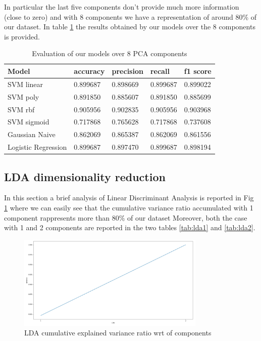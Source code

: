\documentclass[a4paper,12pt]{article}
\begin{document}
\noindent In particular the last five components don't provide much more information (close to zero) and with 8 components we have a representation of around 80\% of our dataset. In table \ref{tab:pca} the results obtained by our models over the 8 components is provided.

\begin{table}[H]
  \begin{tabular}{ |p{6cm}||p{2cm}|p{2cm}|p{2cm}|p{2cm}| }
    \hline
    Model& accuracy & precision  &  recall & f1 score \\
    \hline
SVM linear&           0.899687&   0.898669&  0.899687&  0.899022\\
SVM poly   &          0.891850&   0.885607&  0.891850&  0.885699\\
SVM rbf     &         0.905956&   0.902835&  0.905956&  0.903968\\
SVM sigmoid  &        0.717868&   0.765628&  0.717868&  0.737608\\
Gaussian Naive  &        0.862069&   0.865387&  0.862069&  0.861556\\
Logistic Regression&  0.899687&   0.897470&  0.899687&  0.898194\\
    \hline
  \end{tabular}
  \caption{Evaluation of our models over 8 PCA components}
  \label{tab:pca}
  \end{table}

\newpage
\subsection{LDA dimensionality reduction}

In this section a brief analysis of Linear Discriminant Analysis is reported in Fig \ref{fig:lda} where we can easily see that the cumulative variance ratio accumulated with 1 component rappresents more than 80\% of our dataset
Moreover, both the case with 1 and 2 components are reported in the two tables \ref{tab:lda1} and \ref{tab:lda2}. 

\begin{figure}[H]
  \begin{center}
  \includegraphics[width=0.8\textwidth]{images/lda.png}
  \end{center}
  \caption{LDA cumulative explained variance ratio wrt of components}
  \label{fig:lda}
\end{figure}
\end{document}
